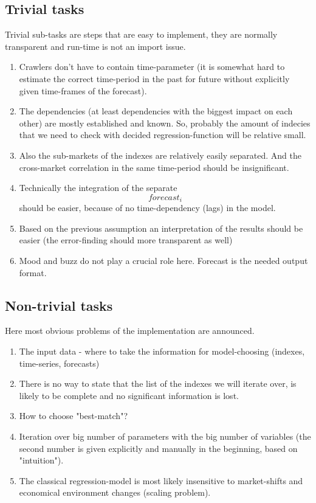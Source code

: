 \documentclass[16pt]{article}
\begin{document}
\subsection{Trivial tasks}
Trivial sub-tasks are steps that are easy to implement, they are normally transparent and run-time is not an import issue.
\begin{enumerate}
	\item Crawlers don't have to contain time-parameter (it is somewhat hard to estimate the correct time-period in the past for future without explicitly given time-frames of the forecast).
	\item The dependencies (at least dependencies with the biggest impact on each other) are mostly established and known. So, probably the amount of indecies that we need to check with decided regression-function will be relative small.
	\item Also the sub-markets of the indexes are relatively easily separated. And the cross-market correlation in the same time-period should be insignificant.
	\item Technically the integration of the separate \[forecast_{i}\] should be easier, because of no time-dependency (lags) in the model.
	\item Based on the previous assumption an interpretation of the results should be easier (the error-finding should more transparent as well) 
	\item Mood and buzz do not play a crucial role here. Forecast is the needed output format.
\end{enumerate}  

\subsection{Non-trivial tasks}
Here most obvious problems of the implementation are announced.
\begin{enumerate}
	 \item The input data - where to take the information for model-choosing (indexes, time-series, forecasts)
	 \item There is no way to state that the list of the indexes we will iterate over, is likely to be complete and no significant information is lost.
	 \item How to choose "best-match"?
	 \item Iteration over big number of parameters with the big number of variables (the second number is given explicitly and manually in the beginning, based on "intuition").
	 \item The classical regression-model is most likely insensitive to market-shifts and economical environment changes (scaling problem).
\end{enumerate}
\end{document}
